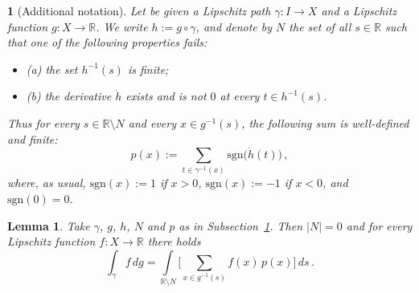 \documentclass[11pt,reqno,a4paper,final]{amsart}
\numberwithin{equation}{section}
\theoremstyle{mytheorem}
\newtheorem{lemma}[subsection]{Lemma}
\theoremstyle{myremark}
\theoremstyle{myparagraph}
\newtheorem{parag}[subsection]{}
\newenvironment{itemizeb}
{\begin{itemize}\itemsep=2pt\leftskip -5 pt}
{\end{itemize}}
\newcommand{\R}{\mathbb{R}}
\newcommand{\sgn}{\mathrm{sgn}}
\begin{document}
\begin{parag}[Additional notation]
\label{s-orientednotation}
Let be given a Lipschitz path $\gamma:I\to X$
and a Lipschitz function $g:X\to\R$.
We write $h:=g\circ\gamma$, 
and denote by $N$ the set of all $s\in\R$ such that one of the following 
properties fails:
%
\begin{itemizeb}
\item[(a)]
the set $h^{-1}(s)$ is finite;
\item[(b)]
the derivative $\dot{h}$ exists and is not $0$
at every $t\in h^{-1}(s)$.
\end{itemizeb}
%
Thus for every $s\in\R\setminus N$ and every $x\in g^{-1}(s)$, 
the following sum is well-defined and finite:
%
\begin{equation}
\label{e-grado}
p(x) := \sum_{t\in\gamma^{-1}(x)} \sgn\big( \dot{h}(t) \big)
\, , 
\end{equation}
%
where, as usual, $\sgn(x):=1$ if $x>0$, $\sgn(x):=-1$ if $x<0$, and $\sgn(0)=0$.
\end{parag}


\begin{lemma}
\label{s-orientedarea}
Take $\gamma$, $g$, $h$, $N$ and $p$ as in Subsection~\ref{s-orientednotation}. 
Then $|N|=0$ and for every Lipschitz function $f:X\to\R$ there holds
%
\begin{equation}
\label{e-orientedarea}
  \int_\gamma f \, dg
= \int\limits_{\R\setminus N} 
    \bigg[ \sum_{x\in g^{-1}(s)} f(x) \, p(x) \bigg] \, ds
\, .
\end{equation}
%
\end{lemma}
\end{document}
